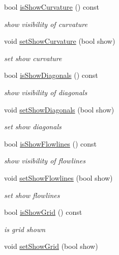 \begin{DoxyCompactItemize}
bool \hyperlink{classShipCAD_1_1Visibility_a36f2e03d75a5a2cfcfc3c637c08bee92}{is\-Show\-Curvature} () const 
\begin{DoxyCompactList}\small\item\em show visibility of curvature \end{DoxyCompactList}\item 
void \hyperlink{classShipCAD_1_1Visibility_a72fa3ed8c721fffe65b29c61329a1d35}{set\-Show\-Curvature} (bool show)
\begin{DoxyCompactList}\small\item\em set show curvature \end{DoxyCompactList}\item 
bool \hyperlink{classShipCAD_1_1Visibility_afa9ae51a7f178d93fe7d6b12ea5a4e63}{is\-Show\-Diagonals} () const 
\begin{DoxyCompactList}\small\item\em show visibility of diagonals \end{DoxyCompactList}\item 
void \hyperlink{classShipCAD_1_1Visibility_a02ff571862dacdbec3248a80ec42eb4f}{set\-Show\-Diagonals} (bool show)
\begin{DoxyCompactList}\small\item\em set show diagonals \end{DoxyCompactList}\item 
bool \hyperlink{classShipCAD_1_1Visibility_a39e12b36d20e2e3ad750e18c248a04f5}{is\-Show\-Flowlines} () const 
\begin{DoxyCompactList}\small\item\em show visibility of flowlines \end{DoxyCompactList}\item 
void \hyperlink{classShipCAD_1_1Visibility_a805b3f5f4a8d7c6b578a79c2539cf192}{set\-Show\-Flowlines} (bool show)
\begin{DoxyCompactList}\small\item\em set show flowlines \end{DoxyCompactList}\item 
bool \hyperlink{classShipCAD_1_1Visibility_a9aa81550e01813b9ec84b40aba5f904e}{is\-Show\-Grid} () const 
\begin{DoxyCompactList}\small\item\em is grid shown \end{DoxyCompactList}\item 
void \hyperlink{classShipCAD_1_1Visibility_a57b601879f10927beb3d466c211e6ee6}{set\-Show\-Grid} (bool show)

\end{DoxyCompactItemize}

